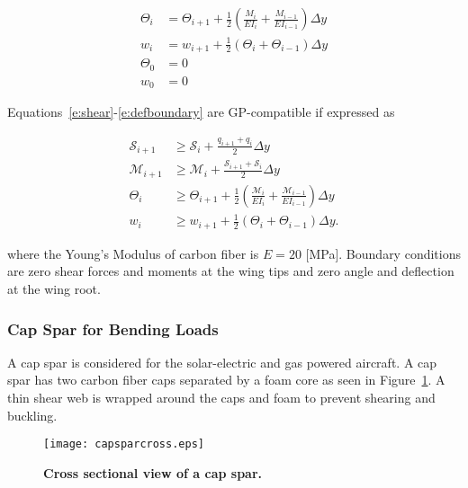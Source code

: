 \begin{align}
    \label{e:angle}
    \Theta_{i} &= \Theta_{i+1} + \frac{1}{2} \left(\frac{M_i}{EI_i} + \frac{M_{i-1}}{EI_{i-1}} \right) \Delta y \\
    \label{e:deflection}
    w_{i} &= w_{i+1} + \frac{1}{2} (\Theta_i + \Theta_{i-1}) \Delta y \\
    \label{e:angleboundary}
    \Theta_0 &= 0 \\
    \label{e:defboundary}
    w_0 &= 0 
\end{align}
 
Equations~\eqref{e:shear}-\eqref{e:defboundary} are GP-compatible if expressed as

\begin{align}
    \label{e:sheargp}
    \mathcal{S}_{i+1} &\geq \mathcal{S}_i + \frac{q_{i+1} + q_i}{2} \Delta y \\
    \label{e:momentgp}
    \mathcal{M}_{i+1} &\geq \mathcal{M}_i + \frac{\mathcal{S}_{i+1} + \mathcal{S}_i}{2} \Delta y \\
    \label{e:anglegp}
    \Theta_{i} &\geq \Theta_{i+1} + \frac{1}{2} \left(\frac{\mathcal{M}_i}{EI_i} + \frac{\mathcal{M}_{i-1}}{EI_{i-1}} \right) \Delta y \\
    \label{e:deflection}
    w_{i} &\geq w_{i+1} + \frac{1}{2} (\Theta_i + \Theta_{i-1}) \Delta y .
\end{align}

where the Young's Modulus of carbon fiber is $E = 20$ [MPa]. Boundary conditions are zero shear forces and moments at the wing tips and zero angle and deflection at the wing root.\cite{bending} \\

\subsubsection{Cap Spar for Bending Loads} 
A cap spar is considered for the solar-electric and gas powered aircraft.  A cap spar has two carbon fiber caps separated by a foam core as seen in Figure~\ref{f:capspar}. A thin shear web is wrapped around the caps and foam to prevent shearing and buckling.

\begin{figure}[h!]
	\begin{center}
	\texttt{[image: capsparcross.eps]}
    \caption{\textbf{Cross sectional view of a cap spar.}}
	\label{f:capspar}
	\end{center}
\end{figure}

